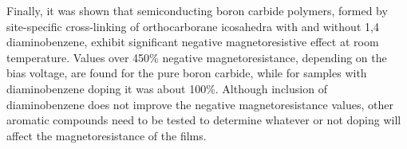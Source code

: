 \noindent \hspace{1cm} Finally, it was shown that semiconducting boron carbide polymers, formed by site-specific cross-linking of orthocarborane icosahedra with and without 1,4 diaminobenzene, exhibit significant negative magnetoresistive effect at room temperature. Values over 450\% negative magnetoresistance, depending on the bias voltage, are found for the pure boron carbide, while for samples with diaminobenzene doping it was about 100\%. Although inclusion of diaminobenzene does not improve the negative magnetoresistance values, other aromatic compounds need to be tested to determine whatever or not doping will affect the magnetoresistance of the films.  

